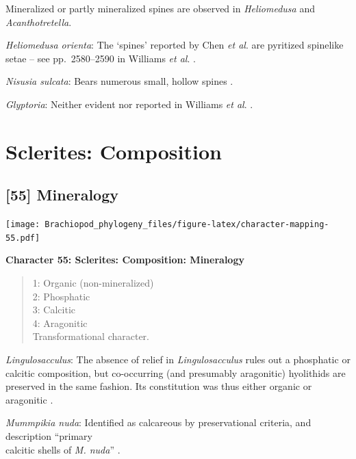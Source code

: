 \documentclass[openany]{book}
\theoremstyle{definition}
\theoremstyle{definition}
\theoremstyle{definition}
\theoremstyle{remark}
\begin{document}
Mineralized or partly mineralized spines are observed in
\emph{Heliomedusa} and \emph{Acanthotretella}.

\emph{Heliomedusa orienta}: The `spines' reported by Chen \emph{et al}.
\citeyearpar{Chen2007Reinterpretationof} are pyritized spinelike\\
setae -- see pp.~2580--2590 in Williams \emph{et al}.
\citeyearpar{Williams2007PartH}.

\emph{Nisusia sulcata}: Bears numerous small, hollow spines
\citep{Williams2000BrachiopodaLinguliformea}.

\emph{Glyptoria}: Neither evident nor reported in Williams \emph{et al}.
\citeyearpar{Williams2000BrachiopodaLinguliformea}.

\hypertarget{sclerites-composition}{%
\section{Sclerites: Composition}\label{sclerites-composition}}

\hypertarget{mineralogy}{%
\subsection*{{[}55{]} Mineralogy}\label{mineralogy}}

\texttt{[image: Brachiopod\_phylogeny\_files/figure-latex/character-mapping-55.pdf]}

\textbf{Character 55: Sclerites: Composition: Mineralogy}

\begin{quote}
1: Organic (non-mineralized)\\
2: Phosphatic\\
3: Calcitic\\
4: Aragonitic\\
Transformational character.
\end{quote}

\emph{Lingulosacculus}: The absence of relief in \emph{Lingulosacculus}
rules out a phosphatic or calcitic composition, but co-occurring (and
presumably aragonitic) hyolithids are preserved in the same fashion. Its
constitution was thus either organic or aragonitic
\citep{Balthasar2009EarlyCambrian}.

\emph{Mummpikia nuda}: Identified as calcareous by preservational
criteria, and description ``primary\\
calcitic shells of \emph{M. nuda}'' \citep{Balthasar2008iMummpikia}.
\end{document}
